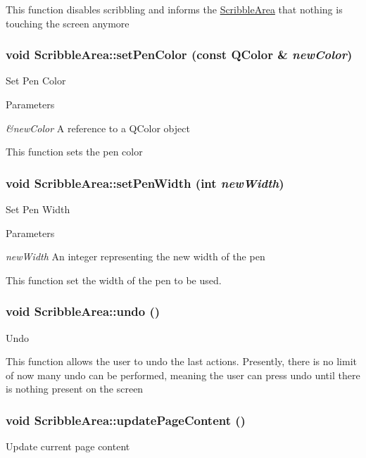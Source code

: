 This function disables scribbling and informs the \hyperlink{classScribbleArea}{ScribbleArea} that nothing is touching the screen anymore \hypertarget{classScribbleArea_a7ad908197d1fba9479da2b88d898ed42}{
\subsubsection[{setPenColor}]{\setlength{\rightskip}{0pt plus 5cm}void ScribbleArea::setPenColor (const QColor \& {\em newColor})}}
\label{classScribbleArea_a7ad908197d1fba9479da2b88d898ed42}
Set Pen Color


\begin{DoxyParams}{Parameters}
\item[{\em \&newColor}]A reference to a QColor object\end{DoxyParams}
This function sets the pen color \hypertarget{classScribbleArea_a3d9093f87987c3123744605a7a2cf15e}{
\subsubsection[{setPenWidth}]{\setlength{\rightskip}{0pt plus 5cm}void ScribbleArea::setPenWidth (int {\em newWidth})}}
\label{classScribbleArea_a3d9093f87987c3123744605a7a2cf15e}
Set Pen Width


\begin{DoxyParams}{Parameters}
\item[{\em newWidth}]An integer representing the new width of the pen\end{DoxyParams}
This function set the width of the pen to be used. \hypertarget{classScribbleArea_a6f0205b4160951f7efef3bc0741eee24}{
\subsubsection[{undo}]{\setlength{\rightskip}{0pt plus 5cm}void ScribbleArea::undo ()}}
\label{classScribbleArea_a6f0205b4160951f7efef3bc0741eee24}
Undo

This function allows the user to undo the last actions. Presently, there is no limit of now many undo can be performed, meaning the user can press undo until there is nothing present on the screen \hypertarget{classScribbleArea_a55407f71c765397a12d7efed18790c4b}{
\subsubsection[{updatePageContent}]{\setlength{\rightskip}{0pt plus 5cm}void ScribbleArea::updatePageContent ()}}
\label{classScribbleArea_a55407f71c765397a12d7efed18790c4b}
Update current page content

